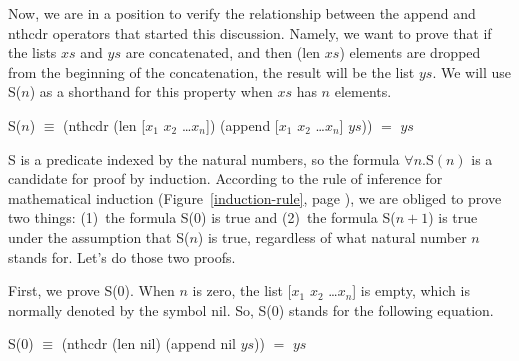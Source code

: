 Now, we are in a position to verify the relationship
between the append and nthcdr operators that started this discussion.
Namely, we want to prove that if the lists $xs$ and $ys$ are concatenated,
and then (len $xs$) elements are dropped from the beginning of the
concatenation, the result will be the list $ys$.
We will use S($n$) as a shorthand for this property
when $xs$ has $n$ elements.

\begin{samepage}
\begin{center}
\label{append-prefix-thm-predicate}
S($n$) $\equiv$ (nthcdr (len [$x_1$ $x_2$ \dots $x_n$]) (append [$x_1$ $x_2$ \dots $x_n$] $ys$)) $=$ $ys$
\end{center}
\end{samepage}


\label{append-suffix-thm-pencil-proof} 
S is a predicate indexed by the natural numbers,
so the formula $\forall n.$S$(n)$ is a candidate for proof by induction.
According to the rule of inference for mathematical induction
(Figure~\ref{induction-rule}, page \pageref{induction-rule}),
we are obliged to prove two things:
(1)~the formula S(0) is true and
(2)~the formula S($n+1$) is true under the assumption that S($n$) is true,
regardless of what natural number $n$ stands for. Let's do those two proofs.

First, we prove S(0).
When $n$ is zero, the list [$x_1$ $x_2$ \dots $x_n$] is empty,
which is normally denoted by the symbol nil.
So, S(0) stands for the following equation.

\begin{samepage}
\begin{center}
S(0) $\equiv$ (nthcdr (len nil) (append nil $ys$)) $=$ $ys$
\end{center}
\end{samepage}


